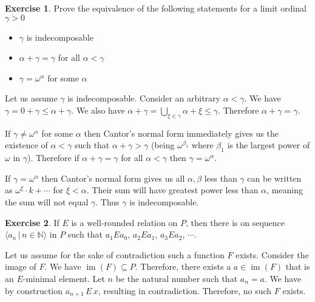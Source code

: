 \documentclass{article}
\theoremstyle{definition}
\newtheorem{exer}{Exercise}[section]
\newcommand{\N}{\mathbb{N}}
\DeclareMathOperator{\im}{im}
\newlength{\defparindent}
\newenvironment{answer}
    {\begin{mdframed}[backgroundcolor=gray!15, linewidth=0pt] \setlength{\parindent}{\defparindent}}
    {\end{mdframed}}
\begin{document}
\newpage

\begin{exer}
    Prove the equivalence of the following statements for a limit ordinal $\gamma > 0$
    \begin{itemize}
        \item $\gamma$ is indecomposable
        \item $\alpha + \gamma = \gamma$ for all $\alpha < \gamma$ 
        \item $\gamma = \omega^\alpha$ for some $\alpha$
    \end{itemize}
    \begin{answer}
        Let us assume $\gamma$ is indecomposable. Consider an arbitrary $\alpha < \gamma$. We have $\gamma = 0 + \gamma \le \alpha + \gamma$. We also have $\alpha + \gamma = \bigcup_{\xi \in \gamma} \alpha + \xi \le \gamma$. Therefore $\alpha + \gamma = \gamma$.
        

        If $\gamma \ne \omega^\alpha$ for some $\alpha$ then Cantor's normal form immediately gives us the existence of $\alpha < \gamma$ such that $\alpha + \gamma > \gamma$ (being $\omega^{\beta_1}$ where $\beta_1$ is the largest power of $\omega$ in $\gamma$). Therefore if $\alpha + \gamma = \gamma$ for all $\alpha < \gamma$ then $\gamma = \omega^\alpha$.
        
        If $\gamma = \omega^\alpha$ then Cantor's normal form gives us all $\alpha, \beta$ less than $\gamma$ can be written as $\omega^{\xi} \cdot k + \cdots$ for $\xi < \alpha$. Their sum will have greatest power less than $\alpha$, meaning the sum will not equal $\gamma$. Thus $\gamma$ is indecomposable.
    \end{answer}
\end{exer}

\begin{exer}
    If $E$ is a well-rounded relation on $P$, then there is on sequence $\langle a_n \, | \, n \in \N \rangle$ in $P$ such that $a_1 E a_0$, $a_2 E a_1$, $a_3 E a_2$, $\cdots$.
    \begin{answer}
        Let us assume for the sake of contradiction such a function $F$ exists. Consider the image of $F$. We have $\im(F) \subseteq P$. Therefore, there exists a $a \in \im(F)$ that is an $E$-minimal element. Let $n$ be the natural number such that $a_n = a$. We have by construction $a_{n + 1} \, E \, x$, resulting in contradiction. Therefore, no such $F$ exists.
    \end{answer}
\end{exer}
\end{document}
